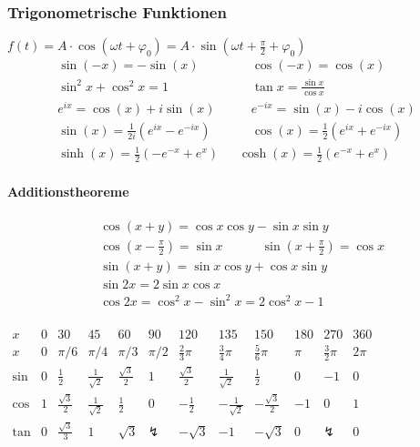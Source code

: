 \documentclass[6pt,a4paper]{scrartcl}
\newcommand{\enbrace}[1]{\ensuremath{\left(#1\right)}}
\begin{document}
\begin{multicols*}{4}
\subsubsection{Trigonometrische Funktionen}
$f(t)=A\cdot \cos(\omega t + \varphi_0)=A\cdot \sin(\omega t + \frac{\pi}{2}+ \varphi_0)$
\begin{eqnarray*}
	\sin (-x) = -\sin (x)  \quad & \quad \cos (-x) = \cos (x) \\
	\sin^2 x + \cos^2 x = 1  \quad & \quad \tan x = \frac{\sin x}{\cos x} \\
	e^{ix}=\cos(x)+i\sin(x) \quad & \quad e^{-ix}=\sin(x)-i\cos(x) \\
	\sin(x)=\frac{1}{2i}\enbrace{e^{ix}-e^{-ix}} \quad & \quad \cos(x)=\frac{1}{2}\enbrace{e^{ix}+e^{-ix}} \\
	\sinh(x)=\frac{1}{2}(-e^{-x}+e^x) & \cosh(x)=\frac{1}{2}(e^{-x}+e^x)
\end{eqnarray*}
\paragraph{Additionstheoreme} %
\label{par:additionstheoreme}
 \begin{eqnarray*}
 	& \cos (x + y) = \cos x \cos y - \sin x \sin y \\
	& \cos \enbrace{x - \frac{\pi}{2}} = \sin x \qquad \quad \sin \enbrace{x + \frac{\pi}{2}} = \cos x \\
    & \sin \enbrace{x + y} = \sin x \cos y + \cos x \sin y \\
& 	\sin 2x = 2 \sin x \cos x        \\
	& \cos 2x = \cos^2 x - \sin^2 x = 2\cos^2 x - 1\\
 \end{eqnarray*}

\hspace{-20pt}
\scalebox{0.77}
{
$\begin{array}{c|c|c|c|c|c|c|c|c|c|c|c}
x & 0& 30 & 45& 60 & 90 & 120 & 135& 150& 180 & 270 & 360 \\ \hline
x & 0 & \pi / 6 & \pi / 4 & \pi / 3 & \pi / 2 & \frac{2}{3}\pi& \frac{3}{4}\pi& \frac{5}{6}\pi& \pi  & \frac{3}{2}\pi & 2 \pi \\ \hline
\sin & 0 & \frac{1}{2} & \frac{1}{\sqrt{2}} & \frac{\sqrt 3}{2} & 1 & \frac{\sqrt 3}{2} & \frac{1}{\sqrt{2}} & \frac{1}{2} & 0 & -1 & 0 \\
\cos & 1 & \frac{\sqrt 3}{2} & \frac{1}{\sqrt 2} & \frac{1}{2} & 0 & -\frac{1}{2} & -\frac{1}{\sqrt 2}  & -\frac{\sqrt 3}{2}   & -1 & 0 & 1 \\     
\tan & 0 & \frac{\sqrt{3}}{3}&1 &\sqrt{3} & \lightning & -\sqrt{3}& -1& -\sqrt{3}& 0 & \lightning & 0\\
\end{array}$
}


\end{multicols*}
\end{document}
